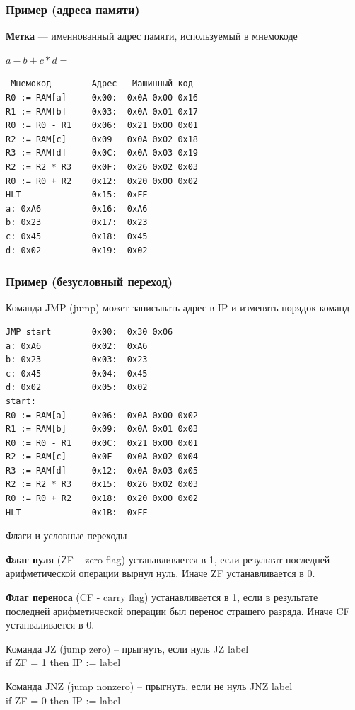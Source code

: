 \documentclass{beamer}
\begin{document}
    \begin{frame}[fragile]
        \frametitle{Пример (адреса памяти)}
        {\bf Метка} --- именнованный адрес памяти, используемый в мнемокоде
        \begin{block}{$a - b + c*d = $}
        \begin{verbatim}
 Мнемокод        Адрес   Машинный код
R0 := RAM[a]     0x00:  0x0A 0x00 0x16
R1 := RAM[b]     0x03:  0x0A 0x01 0x17
R0 := R0 - R1    0x06:  0x21 0x00 0x01
R2 := RAM[c]     0x09   0x0A 0x02 0x18
R3 := RAM[d]     0x0C:  0x0A 0x03 0x19
R2 := R2 * R3    0x0F:  0x26 0x02 0x03
R0 := R0 + R2    0x12:  0x20 0x00 0x02
HLT              0x15:  0xFF
a: 0xA6          0x16:  0xA6
b: 0x23          0x17:  0x23
c: 0x45          0x18:  0x45
d: 0x02          0x19:  0x02
        \end{verbatim}
        \end{block}
\end{frame}
    \begin{frame}[fragile]
        \frametitle{Пример (безусловный переход)}
        Команда JMP (jump) может записывать адрес в IP и изменять порядок команд
        \begin{block}{}
        \begin{verbatim}
JMP start        0x00:  0x30 0x06
a: 0xA6          0x02:  0xA6
b: 0x23          0x03:  0x23
c: 0x45          0x04:  0x45
d: 0x02          0x05:  0x02
start:
R0 := RAM[a]     0x06:  0x0A 0x00 0x02
R1 := RAM[b]     0x09:  0x0A 0x01 0x03
R0 := R0 - R1    0x0C:  0x21 0x00 0x01
R2 := RAM[c]     0x0F   0x0A 0x02 0x04
R3 := RAM[d]     0x12:  0x0A 0x03 0x05
R2 := R2 * R3    0x15:  0x26 0x02 0x03
R0 := R0 + R2    0x18:  0x20 0x00 0x02
HLT              0x1B:  0xFF
        \end{verbatim}
        \end{block}
\end{frame}
    \begin{frame}{Флаги и условные переходы}

    {\bf Флаг нуля} (ZF -- zero flag) устанавливается в 1, если результат последней арифметической операции вырнул нуль. Иначе ZF устанавливается в 0. 

    {\bf Флаг переноса} (CF - carry flag) устанавливается в 1, если в результате последней арифметической операции был перенос страшего разряда. Иначе CF устанваливается в 0.
    \begin{block}{Команда JZ (jump zero) --  прыгнуть, если нуль}
        JZ label \\
        if ZF = 1 then
            IP := label
    \end{block}
    \begin{block}{Команда JNZ (jump nonzero) --  прыгнуть, если не нуль}
    JNZ label \\
    if ZF = 0 then
        IP := label
    \end{block}
    \end{frame}
\end{document}
